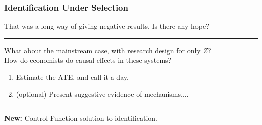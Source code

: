 \documentclass[dvipsnames]{beamer} %
\begin{document}
\begin{frame}[noframenumbering]
    \frametitle{Identification Under Selection}
    That was a long way of giving negative results.
    Is there any hope?
    \par\noindent\rule{\textwidth}{0.4pt}
    \vskip0.25cm
    What about the mainstream case, with research design for only $Z$?\\
    How do economists do causal effects in these systems?
    \begin{enumerate}
        \item Estimate the ATE, and call it a day.
        \item (optional) Present suggestive evidence of mechanisms$\hdots$.
        \hyperlink{suggestive-evidence}{}
    \end{enumerate}
    \vskip0.5cm
    \par\noindent\rule{\textwidth}{0.4pt}
    \vfill
    \textbf{New:} Control Function solution to identification.
\end{frame}
\end{document}
